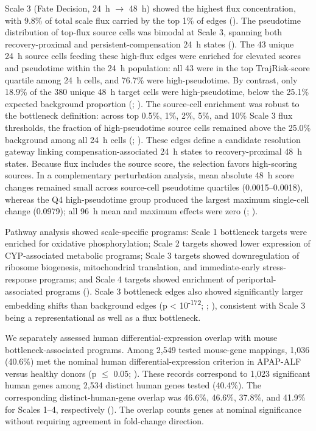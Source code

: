 Scale 3 (Fate Decision, 24~h \ensuremath{\rightarrow} 48~h) showed the highest flux concentration, with 9.8\% of total scale flux carried by the top 1\% of edges (). The pseudotime distribution of top-flux source cells was bimodal at Scale 3, spanning both recovery-proximal and persistent-compensation 24~h states (). The 43 unique 24~h source cells feeding these high-flux edges were enriched for elevated scores and pseudotime within the 24~h population: all 43 were in the top TrajRisk-score quartile among 24~h cells, and 76.7\% were high-pseudotime. By contrast, only 18.9\% of the 380 unique 48~h target cells were high-pseudotime, below the 25.1\% expected background proportion (; ). The source-cell enrichment was robust to the bottleneck definition: across top 0.5\%, 1\%, 2\%, 5\%, and 10\% Scale 3 flux thresholds, the fraction of high-pseudotime source cells remained above the 25.0\% background among all 24~h cells (; ). These edges define a candidate resolution gateway linking compensation-associated 24~h states to recovery-proximal 48~h states. Because flux includes the source score, the selection favors high-scoring sources. In a complementary perturbation analysis, mean absolute 48~h score changes remained small across source-cell pseudotime quartiles (0.0015--0.0018), whereas the Q4 high-pseudotime group produced the largest maximum single-cell change (0.0979); all 96~h mean and maximum effects were zero (; ).

Pathway analysis showed scale-specific programs: Scale 1 bottleneck targets were enriched for oxidative phosphorylation; Scale 2 targets showed lower expression of CYP-associated metabolic programs; Scale 3 targets showed downregulation of ribosome biogenesis, mitochondrial translation, and immediate-early stress-response programs; and Scale 4 targets showed enrichment of periportal-associated programs (). Scale 3 bottleneck edges also showed significantly larger embedding shifts than background edges (p < 10\textsuperscript{-172}; ; ), consistent with Scale 3 being a representational as well as a flux bottleneck.

We separately assessed human differential-expression overlap with mouse bottleneck-associated programs. Among 2,549 tested mouse-gene mappings, 1,036 (40.6\%) met the nominal human differential-expression criterion in APAP-ALF versus healthy donors (p \ensuremath{\leq} 0.05; ). These records correspond to 1,023 significant human genes among 2,534 distinct human genes tested (40.4\%). The corresponding distinct-human-gene overlap was 46.6\%, 46.6\%, 37.8\%, and 41.9\% for Scales 1--4, respectively (). The overlap counts genes at nominal significance without requiring agreement in fold-change direction.


